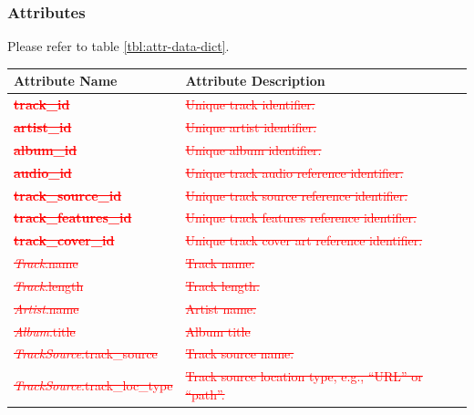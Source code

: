 \documentclass[12pt]{article}
\begin{document}
\subsubsection{Attributes}
Please refer to table \ref{tbl:attr-data-dict}.
\begin{table}[htbp!]
  \centering
  \begin{tabular}{ p{.45\linewidth} || p{.55\linewidth} }
    \textbf{Attribute Name} & \textbf{Attribute Description} \\
    \toprule
    \textcolor{red}{\sout{\textbf{track\_id}}} & \textcolor{red}{\sout{Unique track identifier.}} \\
    \midrule
    \textcolor{red}{\sout{\textbf{artist\_id}}} & \textcolor{red}{\sout{Unique artist identifier.}} \\
    \midrule
    \textcolor{red}{\sout{\textbf{album\_id}}} & \textcolor{red}{\sout{Unique album identifier.}} \\
    \midrule
    \textcolor{red}{\sout{\textbf{audio\_id}}} & \textcolor{red}{\sout{Unique track audio reference identifier.}} \\
    \midrule
    \textcolor{red}{\sout{\textbf{track\_source\_id}}} & \textcolor{red}{\sout{Unique track source reference identifier.}} \\
    \midrule
    \textcolor{red}{\sout{\textbf{track\_features\_id}}} & \textcolor{red}{\sout{Unique track features reference identifier.}} \\
    \midrule
    \textcolor{red}{\sout{\textbf{track\_cover\_id}}} & \textcolor{red}{\sout{Unique track cover art reference identifier.}} \\
    \midrule
    \textcolor{red}{\sout{\emph{Track}.name}} & \textcolor{red}{\sout{Track name.}} \\
    \midrule
    \textcolor{red}{\sout{\emph{Track}.length}} & \textcolor{red}{\sout{Track length.}} \\
    \midrule
    \textcolor{red}{\sout{\emph{Artist}.name}} & \textcolor{red}{\sout{Artist name.}} \\
    \midrule
    \textcolor{red}{\sout{\emph{Album}.title}} & \textcolor{red}{\sout{Album title}} \\
    \midrule
    \textcolor{red}{\sout{\emph{TrackSource}.track\_source}} & \textcolor{red}{\sout{Track source name.}} \\
    \midrule
    \textcolor{red}{\sout{\emph{TrackSource}.track\_loc\_type}} & \textcolor{red}{\sout{Track source location type, e.g., ``URL'' or ``path''.}} \\

\end{tabular}
\end{table}
\end{document}
